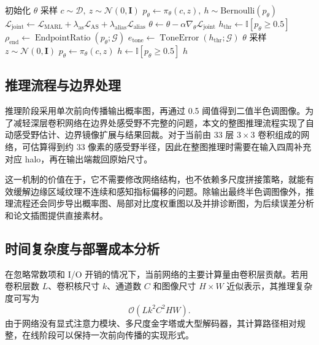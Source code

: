 \documentclass[thesis]{../zstucs-graduation-project}
\begin{document}
\begin{algorithm}[H]
    \caption{基于强化学习的半色调训练与推理流程}
    \label{alg:3-1}
    \small
    \begin{algorithmic}
            \State 初始化 $\theta$
            \Repeat
                \State 采样 $c\sim\mathcal{D},\ z\sim\mathcal{N}(0,\mathbf{I})$
                \State $p_\theta\gets\pi_\theta(c,z),\ h\sim\mathrm{Bernoulli}(p_\theta)$
                \State $\mathcal{L}_{\mathrm{joint}}\gets\mathcal{L}_{\mathrm{MARL}}+\lambda_{\mathrm{as}}\mathcal{L}_{\mathrm{AS}}+\lambda_{\mathrm{alias}}\mathcal{L}_{\mathrm{alias}}$
                \State $\theta\gets\theta-\alpha\nabla_{\theta}\mathcal{L}_{\mathrm{joint}}$
                \State $h_{\mathrm{thr}}\gets\mathbb{I}[p_\theta\ge 0.5]$
                \State $\rho_{\mathrm{end}}\gets\operatorname{EndpointRatio}(p_\theta;\mathcal{G})$
                \State $e_{\mathrm{tone}}\gets\operatorname{ToneError}(h_{\mathrm{thr}};\mathcal{G})$
            \State \Return $\theta$
        \EndProcedure
        \Statex
            \State 采样 $z\sim\mathcal{N}(0,\mathbf{I})$
            \State $p_\theta\gets\pi_\theta(c,z)$
            \State $h\gets\mathbb{I}[p_\theta\ge 0.5]$
            \State \Return $h$
        \EndProcedure
    \end{algorithmic}
\end{algorithm}

\subsection{推理流程与边界处理}
推理阶段采用单次前向传播输出概率图，再通过 0.5 阈值得到二值半色调图像。为了减轻深层卷积网络在边界处感受野不完整的问题，本文的整图推理流程实现了自动感受野估计、边界镜像扩展与结果回裁。对于当前由 33 层 $3\times3$ 卷积组成的网络，可估算得到约 33 像素的感受野半径，因此在整图推理时需要在输入四周补充对应 halo，再在输出端裁回原始尺寸。

这一机制的价值在于，它不需要修改网络结构，也不依赖多尺度拼接策略，就能有效缓解边缘区域纹理不连续和感知指标偏移的问题。除输出最终半色调图像外，推理流程还会同步导出概率图、局部对比度权重图以及并排诊断图，为后续误差分析和论文插图提供直接素材。

\subsection{时间复杂度与部署成本分析}
在忽略常数项和 I/O 开销的情况下，当前网络的主要计算量由卷积层贡献。若用卷积层数 $L$、卷积核尺寸 $k$、通道数 $C$ 和图像尺寸 $H\times W$ 近似表示，其推理复杂度可写为
\begin{equation}
\mathcal{O}(Lk^2C^2HW).
\label{eq:3-5}
\end{equation}
由于网络没有显式注意力模块、多尺度金字塔或大型解码器，其计算路径相对规整，在线阶段可以保持一次前向传播的实现形式。
\end{document}

